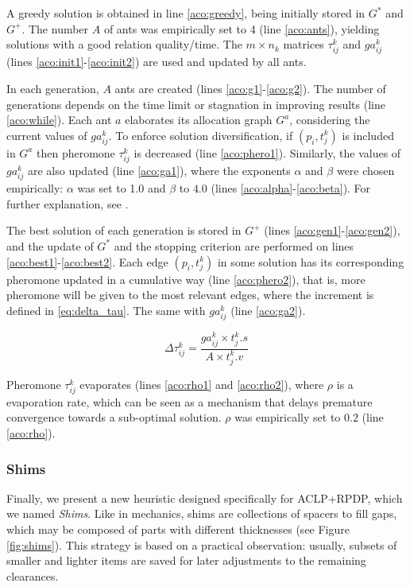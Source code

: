 \documentclass[preprint,authoryear]{elsarticle}
\begin{document}
A greedy solution is obtained in line \ref{aco:greedy}, being initially stored in $G^*$\/ and $G^+$. The number $A$\/ of ants was empirically set to 4 (line \ref{aco:ants}), yielding solutions with a good relation quality/time. The $m \times n_k$\/ matrices $\tau^k_{ij}$ and $ga^k_{ij}$\/ (lines \ref{aco:init1}-\ref{aco:init2}) are used and updated by all ants.

In each generation, $A$\/ ants are created (lines \ref{aco:g1}-\ref{aco:g2}). The number of generations depends on the time limit or stagnation in improving results (line \ref{aco:while}). Each ant $a$\/ elaborates its allocation graph $G^a$, considering the current values of $ga^k_{ij}$. To enforce solution diversification, if $(p_i,t^k_j)$ is included in $G^a$\/ then pheromone $\tau^k_{ij}$\/ is decreased (line \ref{aco:phero1}). Similarly, the values of $ga^k_{ij}$\/ are also updated (line \ref{aco:ga1}), where the exponents $\alpha$\/ and $\beta$\/ were chosen empirically: $\alpha$ was set to 1.0 and $\beta$\/ to $4.0$\/ (lines \ref{aco:alpha}-\ref{aco:beta}). For further explanation, see \cite{DorigoManiezzoColorni1996}. 

The best solution of each generation is stored in $G^+$\/ (lines \ref{aco:gen1}-\ref{aco:gen2}), and the update of $G^*$\/ and the stopping criterion are performed on lines \ref{aco:best1}-\ref{aco:best2}. Each edge $(p_i,t^k_j)$\/ in some solution has its corresponding pheromone updated in a cumulative way (line \ref{aco:phero2}), that is, more pheromone will be given to the most relevant edges, where the increment is defined in \ref{eq:delta_tau}. The same with $ga^k_{ij}$\/ (line \ref{aco:ga2}).

\begin{equation} \label{eq:delta_tau}
	\Delta\tau^k_{ij} = \frac{ ga^k_{ij}\times t^k_j.s }{ A \times t^k_j.v}
\end{equation}

Pheromone $\tau^k_{ij}$\/ evaporates (lines \ref{aco:rho1} and \ref{aco:rho2}), where $\rho$\/ is a evaporation rate, which can be seen as a mechanism that delays premature convergence towards a sub-optimal solution. $\rho$\/ was empirically set to $0.2$\/ (line \ref{aco:rho}). 




\subsubsection{Shims}


Finally, we present a new heuristic designed specifically for ACLP+RPDP, which we named \emph{Shims}. Like in mechanics, shims are collections of spacers to fill gaps, which may be composed of parts with different thicknesses (see Figure \ref{fig:shims}). This strategy is based on a practical observation: usually, subsets of smaller and lighter items are saved for later adjustments to the remaining clearances.
\end{document}
